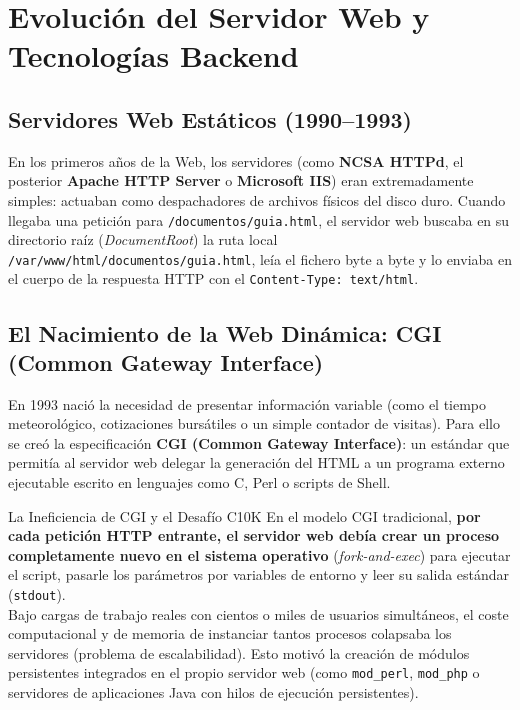 \section{Evolución del Servidor Web y Tecnologías Backend}

\subsection{Servidores Web Estáticos (1990--1993)}

En los primeros años de la Web, los servidores (como \textbf{NCSA HTTPd}, el posterior \textbf{Apache HTTP Server} o \textbf{Microsoft IIS}) eran extremadamente simples: actuaban como despachadores de archivos físicos del disco duro. 
Cuando llegaba una petición para \texttt{/documentos/guia.html}, el servidor web buscaba en su directorio raíz (\textit{DocumentRoot}) la ruta local \texttt{/var/www/html/documentos/guia.html}, leía el fichero byte a byte y lo enviaba en el cuerpo de la respuesta HTTP con el \texttt{Content-Type: text/html}.

\subsection{El Nacimiento de la Web Dinámica: CGI (Common Gateway Interface)}

En 1993 nació la necesidad de presentar información variable (como el tiempo meteorológico, cotizaciones bursátiles o un simple contador de visitas). Para ello se creó la especificación \textbf{CGI (Common Gateway Interface)}: un estándar que permitía al servidor web delegar la generación del HTML a un programa externo ejecutable escrito en lenguajes como C, Perl o scripts de Shell.

\begin{importante}{La Ineficiencia de CGI y el Desafío C10K}
En el modelo CGI tradicional, \textbf{por cada petición HTTP entrante, el servidor web debía crear un proceso completamente nuevo en el sistema operativo} (\textit{fork-and-exec}) para ejecutar el script, pasarle los parámetros por variables de entorno y leer su salida estándar (\texttt{stdout}).\\
Bajo cargas de trabajo reales con cientos o miles de usuarios simultáneos, el coste computacional y de memoria de instanciar tantos procesos colapsaba los servidores (problema de escalabilidad). Esto motivó la creación de módulos persistentes integrados en el propio servidor web (como \texttt{mod\_perl}, \texttt{mod\_php} o servidores de aplicaciones Java con hilos de ejecución persistentes).
\end{importante}

